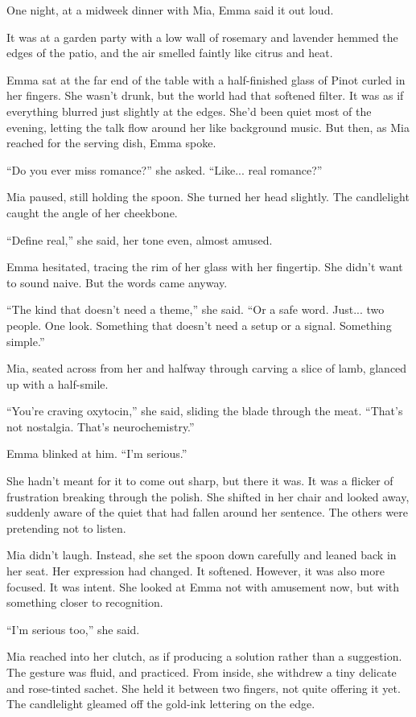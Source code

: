 \medskip

One night, at a midweek dinner with Mia, Emma said it out loud.

It was at a garden party 
with a low wall of rosemary and lavender hemmed the edges of the patio, and the air 
smelled faintly like citrus and heat.

Emma sat at the far end of the table with a half-finished glass of Pinot curled in her fingers. She 
wasn’t drunk, but the world had that softened filter. It was as if everything blurred just slightly 
at the edges. She’d been quiet most of the evening, letting the talk flow around her like background 
music. But then, as Mia reached for the serving dish, Emma spoke.

``Do you ever miss romance?'' she asked. ``Like... real romance?''

Mia paused, still holding the spoon. She turned her head slightly. The candlelight caught the 
angle of her cheekbone.

``Define real,'' she said, her tone even, almost amused.

Emma hesitated, tracing the rim of her glass with her fingertip. She didn’t want to sound naive. But 
the words came anyway.

``The kind that doesn’t need a theme,'' she said. ``Or a safe word. Just... two people. One look. 
Something that doesn't need a setup or a signal. Something simple.''

Mia, seated across from her and halfway through carving a slice of lamb, glanced up with a half-smile.

``You’re craving oxytocin,'' she said, sliding the blade through the meat. ``That’s not 
nostalgia. That’s neurochemistry.''

Emma blinked at him. ``I’m serious.''

She hadn’t meant for it to come out sharp, but there it was. It was a flicker of frustration 
breaking through 
the polish. She shifted in her chair and looked away, suddenly aware of the quiet that had 
fallen around her 
sentence. The others were pretending not to listen.

Mia didn’t laugh. Instead, she set the spoon down carefully and leaned back in her seat. 
Her expression had 
changed. It softened. However, it was also more focused. It was intent. She looked at Emma 
not with amusement now, 
but with something closer to recognition.

``I’m serious too,'' she said.

Mia reached into her clutch, as if producing a solution rather than a suggestion. The gesture 
was fluid, and  
practiced. From inside, she withdrew a tiny delicate and rose-tinted sachet. She held it between 
two fingers, 
not quite offering it yet. The candlelight gleamed off the gold-ink lettering on the edge.

